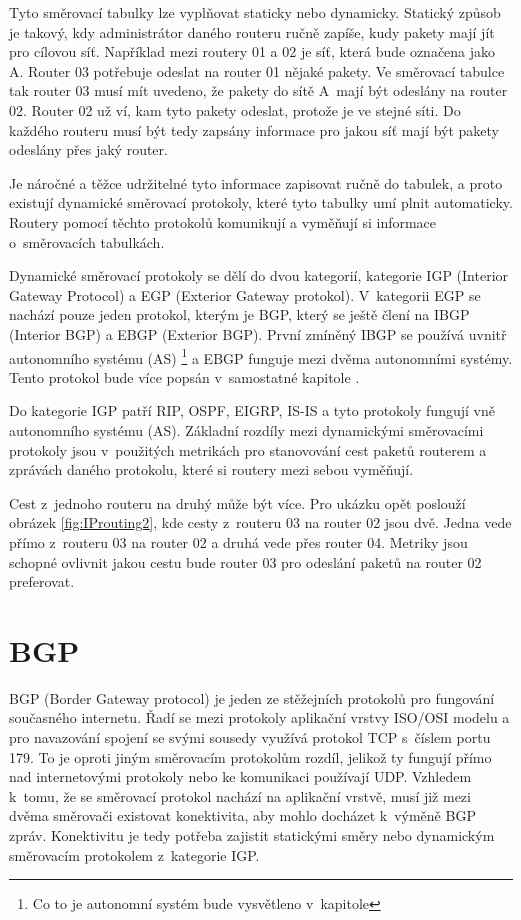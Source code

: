 \documentclass[thesis=M,czech]{src/FITthesis}[2019/12/23]
\begin{document}
Tyto směrovací tabulky lze vyplňovat staticky nebo dynamicky. Statický způsob je takový, kdy administrátor daného routeru ručně zapíše, kudy pakety mají jít pro cílovou síť. Například mezi routery 01 a 02 je síť, která bude označena jako A. Router 03 potřebuje odeslat na router 01 nějaké pakety. Ve směrovací tabulce tak router 03  musí mít uvedeno, že pakety do sítě A~mají být odeslány na router 02. Router 02 už ví, kam tyto pakety odeslat, protože je ve stejné síti. Do každého routeru musí být tedy zapsány informace pro jakou síť mají být pakety odeslány přes jaký router.

Je náročné a těžce udržitelné tyto informace zapisovat ručně do tabulek, a proto existují dynamické směrovací protokoly, které tyto tabulky umí plnit automaticky. Routery pomocí těchto protokolů komunikují a vyměňují si informace o~směrovacích tabulkách. 

Dynamické směrovací protokoly se dělí do dvou kategorií, kategorie IGP (Interior Gateway Protocol) a EGP (Exterior Gateway protokol). V~kategorii EGP se nachází pouze jeden protokol, kterým je BGP, který se ještě člení na IBGP (Interior BGP) a EBGP (Exterior BGP). První zmíněný IBGP se používá uvnitř autonomního systému (AS) \footnote{Co to je autonomní systém bude vysvětleno v~kapitole } a EBGP funguje mezi dvěma autonomními systémy. Tento protokol bude více popsán v~samostatné kapitole .

Do kategorie IGP patří RIP, OSPF, EIGRP, IS-IS a tyto protokoly fungují vně autonomního systému (AS). Základní rozdíly mezi dynamickými směrovacími protokoly jsou v~použitých metrikách pro stanovování cest paketů routerem a zprávách daného protokolu, které si routery mezi sebou vyměňují. 

Cest z~jednoho routeru na druhý může být více. Pro ukázku opět poslouží obrázek \ref{fig:IProuting2}, kde cesty z~routeru 03 na router 02 jsou dvě. Jedna vede přímo z~routeru 03 na router 02 a druhá vede přes router 04. Metriky jsou schopné ovlivnit jakou cestu bude router 03 pro odeslání paketů na router 02 preferovat. \cite{IPv6, unix-handbook} 


\section{BGP}
\label{sec:BGP}
BGP (Border Gateway protocol) je jeden ze stěžejních protokolů pro fungování současného internetu. Řadí se mezi protokoly aplikační vrstvy ISO/OSI modelu a pro navazování spojení se svými sousedy využívá protokol TCP s~číslem portu 179. To je oproti jiným směrovacím protokolům rozdíl, jelikož ty fungují přímo nad internetovými protokoly nebo ke komunikaci používají UDP. Vzhledem k~tomu, že se směrovací protokol nachází na aplikační vrstvě, musí již mezi dvěma směrovači existovat konektivita, aby mohlo docházet k~výměně BGP zpráv. Konektivitu je tedy potřeba zajistit statickými směry nebo dynamickým směrovacím protokolem z~kategorie IGP. \cite{oreilly-bgp, RFC1654, cisco-bgp}
\end{document}

